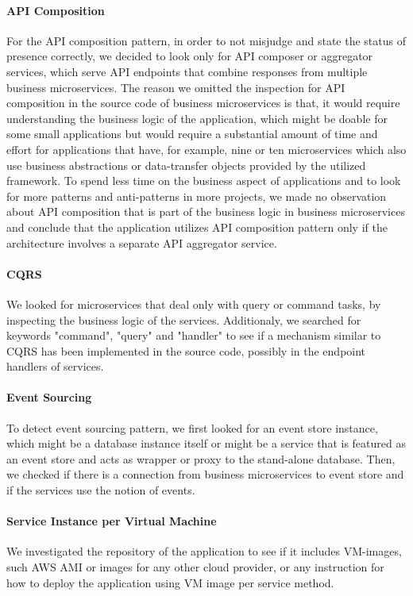 \documentclass{Configuration_Files/PoliMi3i_thesis}
\begin{document}
\paragraph{API Composition} For the API composition pattern, in order to not misjudge and state the status of presence correctly, we decided to look only for API composer or aggregator services, which serve API endpoints that combine responses from multiple business microservices.
The reason we omitted the inspection for API composition in the source code of business microservices is that, it would require understanding the business logic of the application, which might be doable for some small applications but would require a substantial amount of time and effort for applications that have, for example, nine or ten microservices which also use business abstractions or data-transfer objects provided by the utilized framework.
To spend less time on the business aspect of applications and to look for more patterns and anti-patterns in more projects, we made no observation about API composition that is part of the business logic in business microservices and conclude that the application utilizes API composition pattern only if the architecture involves a separate API aggregator service.

\paragraph{CQRS} We looked for microservices that deal only with query or command tasks, by inspecting the business logic of the services. 
Additionaly, we searched for keywords "command", "query" and "handler" to see if a mechanism similar to CQRS has been implemented in the source code, possibly in the endpoint handlers of services.

\paragraph{Event Sourcing} To detect event sourcing pattern, we first looked for an event store instance, which might be a database instance itself or might be a service that is featured as an event store and acts as wrapper or proxy to the stand-alone database.
Then, we checked if there is a connection from business microservices to event store and if the services use the notion of events.

\paragraph{Service Instance per Virtual Machine} We investigated the repository of the application to see if it includes VM-images, such AWS AMI or images for any other cloud provider, or any instruction for how to deploy the application using VM image per service method.
\end{document}
